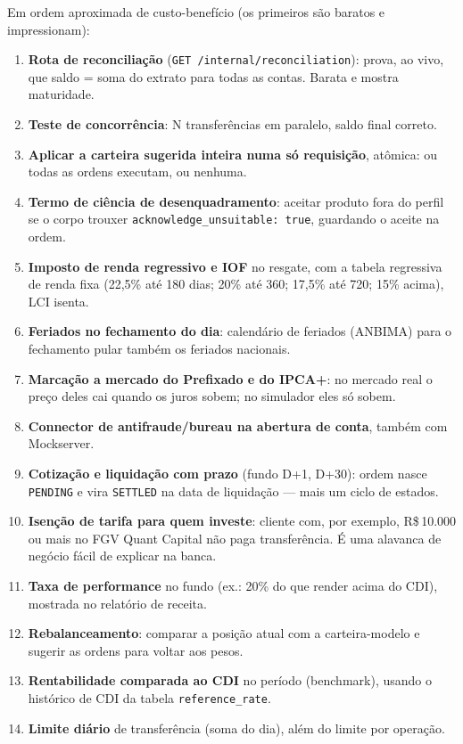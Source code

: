 \documentclass[11pt,a4paper]{article}
\newcommand{\fundo}{FGV Quant Capital}     %
\newcommand{\rs}{R\$\,}
\newcommand{\tb}[1]{\texttt{#1}}           %
\begin{document}
Em ordem aproximada de custo-benefício (os primeiros são baratos e impressionam):

\begin{enumerate}
  \item \textbf{Rota de reconciliação} (\tb{GET /internal/reconciliation}): prova, ao vivo, que
  saldo = soma do extrato para todas as contas. Barata e mostra maturidade.
  \item \textbf{Teste de concorrência}: N transferências em paralelo, saldo final correto.
  \item \textbf{Aplicar a carteira sugerida inteira numa só requisição}, atômica: ou todas as
  ordens executam, ou nenhuma.
  \item \textbf{Termo de ciência de desenquadramento}: aceitar produto fora do perfil se o corpo
  trouxer \tb{acknowledge_unsuitable: true}, guardando o aceite na ordem.
  \item \textbf{Imposto de renda regressivo e IOF} no resgate, com a tabela regressiva de renda fixa
  (22,5\% até 180 dias; 20\% até 360; 17,5\% até 720; 15\% acima), LCI isenta.
  \item \textbf{Feriados no fechamento do dia}: calendário de feriados (ANBIMA) para o fechamento
  pular também os feriados nacionais.
  \item \textbf{Marcação a mercado do Prefixado e do IPCA+}: no mercado real o preço deles cai
  quando os juros sobem; no simulador eles só sobem.
  \item \textbf{Connector de antifraude/bureau na abertura de conta}, também com Mockserver.
  \item \textbf{Cotização e liquidação com prazo} (fundo D+1, D+30): ordem nasce \tb{PENDING} e vira
  \tb{SETTLED} na data de liquidação --- mais um ciclo de estados.
  \item \textbf{Isenção de tarifa para quem investe}: cliente com, por exemplo, \rs 10.000 ou mais
  no \fundo{} não paga transferência. É uma alavanca de negócio fácil de explicar na banca.
  \item \textbf{Taxa de performance} no fundo (ex.: 20\% do que render acima do CDI), mostrada no
  relatório de receita.
  \item \textbf{Rebalanceamento}: comparar a posição atual com a carteira-modelo e sugerir as
  ordens para voltar aos pesos.
  \item \textbf{Rentabilidade comparada ao CDI} no período (benchmark), usando o histórico de CDI
  da tabela \tb{reference_rate}.
  \item \textbf{Limite diário} de transferência (soma do dia), além do limite por operação.

\end{enumerate}
\end{document}
